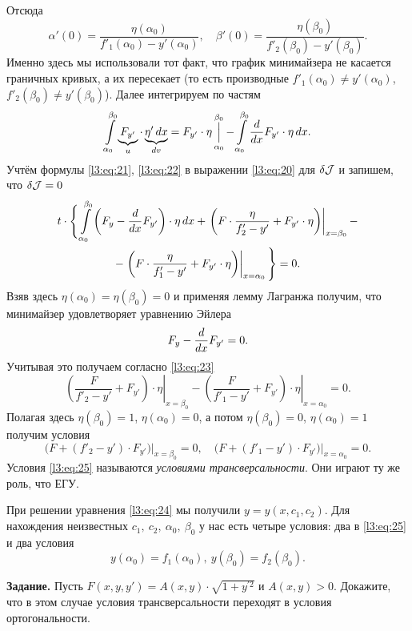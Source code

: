 Отсюда 
\begin{equation}
	\label{l3:eq:21}
	\alpha'(0)=\frac{\eta(\alpha_0)}{f'_1(\alpha_0)-y'(\alpha_0)},\quad \beta'(0)=\frac{\eta(\beta_0)}{f'_2(\beta_0)-y'(\beta_0)}.
\end{equation}
Именно здесь мы использовали тот факт, что график минимайзера не касается граничных кривых, а их пересекает (то есть производные $f'_1(\alpha_0)\neq y'(\alpha_0)$,\ $f'_2(\beta_0)\neq y'(\beta_0)$). Далее интегрируем по частям 
\begin{equation}
	\label{l3:eq:22}
	\int\limits_{\alpha_0}^{\beta_0}\underbrace{F_{y'}}_{u}\cdot\underbrace{\eta'\,dx}_{dv}=F_{y'}\cdot\eta\mathop{\Big|}\limits_{\alpha_0}^{\beta_0}-\int\limits_{\alpha_0}^{\beta_0}\frac{d}{dx}F_{y'}\cdot\eta\,dx.
\end{equation}
Учтём формулы \eqref{l3:eq:21}, \eqref{l3:eq:22} в выражении \eqref{l3:eq:20} для $\delta\mathcal{J}$ и запишем, что $\delta\mathcal{J}=0$
\begin{multline}
	\label{l3:eq:23}
	t\cdot\Bigg\{\int\limits_{\alpha_0}^{\beta_0}\left(F_{y}-\frac{d}{dx}F_{y'}\right)\cdot\eta\,dx+\left.\left(F\cdot\frac{\eta}{f'_2-y'}+F_{y'}\cdot\eta\right)\right|_{x=\beta_0}-\\-\left.\left(F\cdot\frac{\eta}{f'_1-y'}+F_{y'}\cdot\eta\right)\right|_{x=\alpha_0}\Bigg\}=0.
\end{multline}
Взяв здесь $\eta(\alpha_0)=\eta(\beta_0)=0$ и применяя лемму Лагранжа получим, что минимайзер удовлетворяет уравнению Эйлера 
\begin{equation}
	\label{l3:eq:24}
	 F_{y}-\frac{d}{dx}F_{y'}=0.
\end{equation}
Учитывая это получаем согласно \eqref{l3:eq:23} 
\begin{equation*}
	\left.\left(\frac{F}{f'_2-y'}+F_{y'}\right)\cdot\eta\right|_{x=\beta_0}-\left.\left(\frac{F}{f'_1-y'}+F_{y'}\right)\cdot\eta\right|_{x=\alpha_0}=0.
\end{equation*}
Полагая здесь $\eta(\beta_0)=1$, $\eta(\alpha_0)=0$, а потом $\eta(\beta_0)=0$, $\eta(\alpha_0)=1$ получим условия
\begin{equation}
	\label{l3:eq:25}
	 \Big(F+(f'_2-y')\cdot F_{y'}\Big)\Big|_{x=\beta_0}=0,\quad \Big(F+(f'_1-y')\cdot F_{y'}\Big)\Big|_{x=\alpha_0}=0.
\end{equation}
Условия \eqref{l3:eq:25} называются \emph{условиями трансверсальности}. Они играют ту же роль, что ЕГУ.

При решении уравнения \eqref{l3:eq:24} мы получили $y=y(x,c_1,c_2)$. Для нахождения неизвестных $c_1,\ c_2,\ \alpha_0,\ \beta_0$ у нас есть четыре условия: два в \eqref{l3:eq:25} и два условия
\begin{equation*}
	 y(\alpha_0)=f_1(\alpha_0),\ y(\beta_0)=f_2(\beta_0).
\end{equation*}

\noindent\textbf{Задание. }Пусть $F(x,y,y')=A(x,y)\cdot\sqrt{1+y^{\prime2}}$ и $A(x,y)>0$. Докажите, что в этом случае условия трансверсальности переходят в условия ортогональности. 